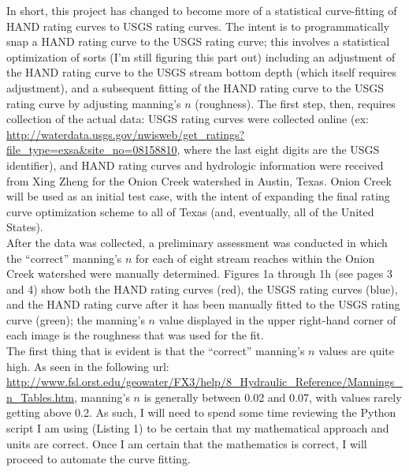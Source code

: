 \documentclass[11pt]{article}
\begin{document}
In short, this project has changed to become more of a statistical curve-fitting of  HAND rating curves to USGS rating curves. The intent is to programmatically snap a HAND rating curve to the USGS rating curve; this involves a statistical optimization of sorts (I'm still figuring this part out) including an adjustment of the HAND rating curve to the USGS stream bottom depth (which itself requires adjustment), and a subsequent fitting of the HAND rating curve to the USGS rating curve by adjusting manning's $n$ (roughness). The first step, then, requires collection of the actual data: USGS rating curves were collected online (ex: \url{http://waterdata.usgs.gov/nwisweb/get_ratings?file_type=exsa&site_no=08158810}, where the last eight digits are the USGS identifier), and HAND rating curves and hydrologic information were received from Xing Zheng for the Onion Creek watershed in Austin, Texas. Onion Creek will be used as an initial test case, with the intent of expanding the final rating curve optimization scheme to all of Texas (and, eventually, all of the United States). \\


After the data was collected, a preliminary assessment was conducted in which the ``correct'' manning's $n$ for each of eight stream reaches within the Onion Creek watershed were manually determined. Figures 1a through 1h (see pages 3 and 4) show both the HAND rating curves (red), the USGS rating curves (blue), and the HAND rating curve after it has been manually fitted to the USGS rating curve (green); the manning's $n$ value displayed in the upper right-hand corner of each image is the roughness that was used for the fit. \\

The first thing that is evident is that the ``correct'' manning's $n$ values are quite high. As seen in the following url: \url{http://www.fsl.orst.edu/geowater/FX3/help/8_Hydraulic_Reference/Mannings_n_Tables.htm}, manning's $n$ is generally between 0.02 and 0.07, with values rarely getting above 0.2. As such, I will need to spend some time reviewing the Python script I am using (Listing 1) to be certain that my mathematical approach and units are correct. Once I am certain that the mathematics is correct, I will proceed to automate the curve fitting. 
\end{document}
